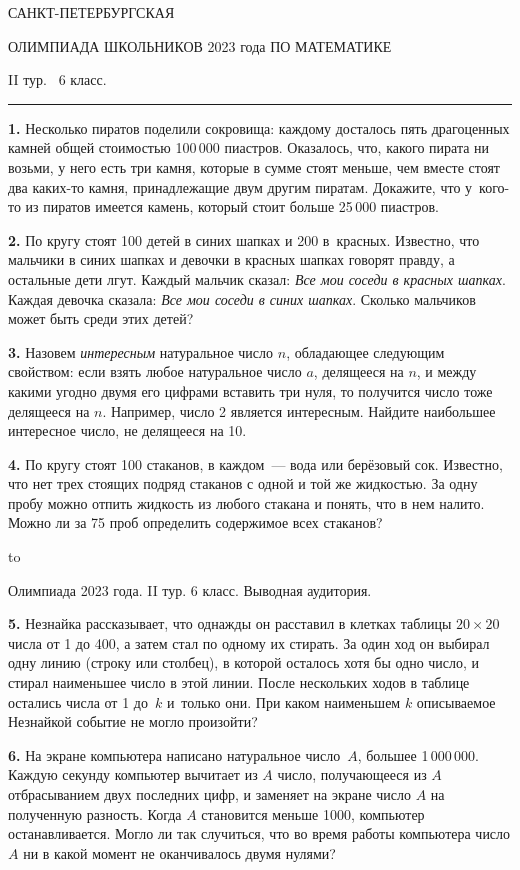 \documentclass[12pt]{article}
\def\q#1.{{\bf #1. }}
\def\dotline{\smallskip\hbox to \hsize{\dotfill}\medskip}
\begin{document}
\centerline{\sc САНКТ-ПЕТЕРБУРГСКАЯ}
\centerline{\sc ОЛИМПИАДА ШКОЛЬНИКОВ 2023 года ПО МАТЕМАТИКЕ}
\centerline{\sc II тур. \ 6 класс.}
\medskip
\hrule
\bigskip

\q1. Несколько пиратов поделили сокровища: каждому досталось пять драгоценных камней общей стоимостью 100\,000 пиастров. Оказалось, что, какого пирата ни возьми, у него есть три камня, которые в сумме стоят меньше, чем вместе стоят два каких-то камня, принадлежащие двум другим пиратам. Докажите, что у~кого-то из пиратов имеется камень, который стоит больше 25\,000 пиастров.

\q2. По кругу стоят 100 детей в синих шапках и 200 в~красных. Известно, что мальчики в синих шапках и девочки в красных шапках говорят правду, а остальные дети лгут. Каждый мальчик сказал: \emph{Все мои соседи в красных шапках}. Каждая девочка сказала: \emph{Все мои соседи в синих шапках}. Сколько мальчиков может быть среди этих детей?

\q3. Назовем \emph{интересным} натуральное число $n$, обладающее следующим свойством: если взять любое натуральное число $a$, делящееся на $n$, и между какими угодно двумя его цифрами вставить три нуля, то получится число тоже делящееся на $n$. Например, число 2 является интересным. Найдите наибольшее интересное число, не делящееся на 10.

\q4. По кругу стоят 100 стаканов, в каждом~--- вода или берёзовый сок. Известно, что нет трех стоящих подряд стаканов с одной и той же жидкостью. За одну пробу можно отпить жидкость из любого стакана и понять, что в нем налито. Можно ли за 75 проб определить содержимое всех стаканов?

\dotline

\centerline{Олимпиада 2023 года. II тур. 6 класс. Выводная аудитория.}
\smallskip

\q5. Незнайка рассказывает, что однажды он расставил в клетках таблицы $20\times 20$ числа от 1 до 400, а затем стал по одному их стирать. За один ход он выбирал одну линию (строку или столбец), в которой осталось хотя бы одно число, и стирал наименьшее число в этой линии. После нескольких ходов в таблице остались числа от 1 до~$k$ и~только они. При каком наименьшем $k$ описываемое Незнайкой событие {\sc не} могло произойти?

\q6. На экране компьютера написано натуральное число~$A$, большее 1\,000\,000. Каждую секунду компьютер вычитает из $A$ число, получающееся из $A$ отбрасыванием двух последних цифр, и заменяет на экране число $A$ на полученную разность. Когда $A$ становится меньше 1000, компьютер останавливается. 
Могло ли так случиться, что во время работы компьютера число $A$ ни в какой момент не оканчивалось двумя нулями?
\end{document}
